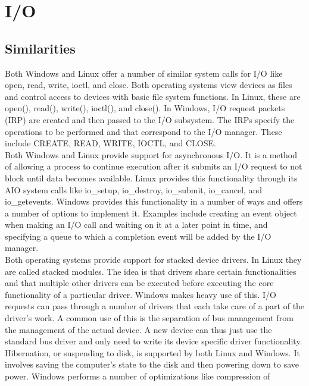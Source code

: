 \documentclass[letterpaper,10pt,titlepage]{article}
\begin{document}
\section{I/O}
\subsection{Similarities}
Both Windows and Linux offer a number of similar system calls for I/O like 
open, read, write, ioctl, and close. Both operating systems view devices as 
files and control access to devices with basic file system functions. In 
Linux, these are open(), read(), write(), ioctl(), and close(). In Windows, 
I/O request packets (IRP) are created and then passed to the I/O subsystem. 
The IRPs specify the operations to be performed and that correspond to the 
I/O manager. These include CREATE, READ, WRITE, IOCTL, and CLOSE.
\\
\linebreak
Both Windows and Linux provide support for asynchronous I/O. It is a method of
allowing a process to continue execution after it submits an I/O request to 
not block until data becomes available. Linux provides this functionality 
through its AIO system calls like io\_setup, io\_destroy, io\_submit,
io\_cancel, and io\_getevents. Windows provides this functionality in a number
of ways and offers a number of options to implement it. Examples include 
creating an event object when making an I/O call and waiting on it at a later 
point in time, and specifying a queue to which a completion event will be 
added by the I/O manager.
\\
\linebreak
Both operating systems provide support for stacked device drivers. In Linux
they are called stacked modules. The idea is that drivers share certain 
functionalities and that multiple other drivers can be executed before 
executing the core functionality of a particular driver. Windows makes heavy 
use of this. I/O requests can pass through a number of drivers that each take 
care of a part of the driver's work. A common use of this is the separation of
bus management from the management of the actual device. A new device can 
thus just use the standard bus driver and only need to write its device 
specific driver functionality.
\\
\linebreak
Hibernation, or suspending to disk, is supported by both Linux and Windows.
It involves saving the computer's state to the disk and then powering down to
save power. Windows performs a number of optimizations like compression of 
\end{document}
